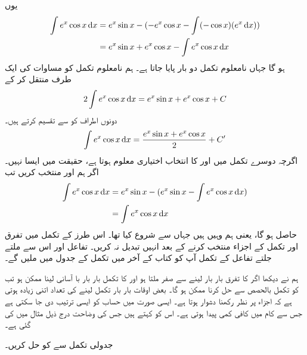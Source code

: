 یوں
\begin{align*}
\int e^x\cos x\dif x&=e^x\sin x-(-e^x\cos x-\int(-\cos x)(e^x\dif x))\\
&=e^x\sin x+e^x\cos x-\int e^x\cos x\dif x
\end{align*}
ہو گا جہاں نامعلوم تکمل  دو بار پایا جاتا ہے۔ ہم نامعلوم تکمل کو  مساوات کی ایک طرف منتقل کر کے
\begin{align*}
2\int e^x\cos x\dif x=e^x\sin x+e^x\cos x+C
\end{align*}
دونوں اطراف کو  سے تقسیم کرتے ہیں۔
\begin{align*}
\int e^x\cos x\dif x=\frac{e^x\sin x+e^x\cos x}{2}+C'
\end{align*}
اگرچہ دوسرے تکمل میں  اور  کا انتخاب اختیاری معلوم ہوتا ہے، حقیقت میں ایسا نہیں۔ اگر ہم  اور  منتخب کریں تب
\begin{align*}
\int e^x\cos x\dif x&=e^x\sin x-(e^x\sin x-\int e^x\cos x\dif x)\\
&=\int e^x\cos x\dif x
\end{align*} 
حاصل ہو گا، یعنی ہم وہیں ہیں جہاں سے شروع کیا تھا۔ اس طرز کے تکمل میں تفرق اور تکمل کے اجزاء منتخب کرنے کے بعد انہیں تبدیل نہ کریں۔ تفاعل  اور اس سے ملتے جلتے تفاعل  کے تکمل آپ کو کتاب کے آخر میں تکمل کے جدول میں ملیں گے۔

ہم نے دیکھا اگر  کا تفرق بار بار لینے سے صفر ملتا ہو اور  کا تکمل بار بار با آسانی لینا ممکن ہو تب   کو تکمل بالحصص سے حل کرنا ممکن ہو گا۔ بعض اوقات بار بار  تکمل لینے کی تعداد اتنی زیادہ ہوتی ہے کہ اجزاء پر نظر رکھنا دشوار ہوتا ہے۔ ایسی صورت میں حساب کو ایسی ترتیب دی جا سکتی ہے جس سے کام میں کافی کمی پیدا ہوتی ہے۔ اس کو  کہتے ہیں جس کی وضاحت درج ذیل مثال میں کی گئی ہے۔  

جدولی تکمل سے  کو حل کریں۔

